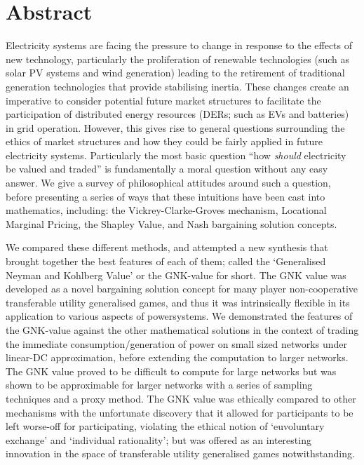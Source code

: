 \chapter*{Abstract}
\vspace{-1em}


Electricity systems are facing the pressure to change in response to the effects of new technology, particularly the proliferation of renewable technologies (such as solar PV systems and wind generation) leading to the retirement of traditional generation technologies that provide stabilising inertia.
These changes create an imperative to consider potential future market structures to facilitate the participation of distributed energy resources (DERs; such as EVs and batteries) in grid operation.
However, this gives rise to general questions surrounding the ethics of market structures and how they could be fairly applied in future electricity systems. Particularly the most basic question ``how \textit{should} electricity be valued and traded'' is fundamentally a moral question without any easy answer.
We give a survey of philosophical attitudes around such a question, before presenting a series of ways that these intuitions have been cast into mathematics, including: the Vickrey-Clarke-Groves mechanism, Locational Marginal Pricing, the Shapley Value, and Nash bargaining solution concepts.

We compared these different methods, and attempted a new synthesis that brought together the best features of each of them; called the `Generalised Neyman and Kohlberg Value' or the GNK-value for short.
The GNK value was developed as a novel bargaining solution concept for many player non-cooperative transferable utility generalised games, and thus it was intrinsically flexible in its application to various aspects of powersystems.
We demonstrated the features of the GNK-value against the other mathematical solutions in the context of trading the immediate consumption/generation of power on small sized networks under linear-DC approximation, before extending the computation to larger networks.
The GNK value proved to be difficult to compute for large networks but was shown to be approximable for larger networks with a series of sampling techniques and a proxy method.
The GNK value was ethically compared to other mechanisms with the unfortunate discovery that it allowed for participants to be left worse-off for participating, violating the ethical notion of `euvoluntary exchange' and `individual rationality'; but was offered as an interesting innovation in the space of transferable utility generalised games notwithstanding.

